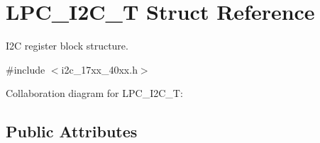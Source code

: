 \hypertarget{structLPC__I2C__T}{}\section{L\+P\+C\+\_\+\+I2\+C\+\_\+T Struct Reference}
\label{structLPC__I2C__T}


I2C register block structure.  




{\ttfamily \#include $<$i2c\+\_\+17xx\+\_\+40xx.\+h$>$}



Collaboration diagram for L\+P\+C\+\_\+\+I2\+C\+\_\+T\+:
\subsection*{Public Attributes}
